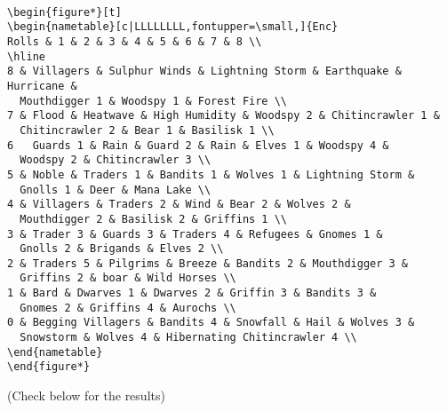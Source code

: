 \documentclass[a4paper,openany]{book}
\begin{document}
\begin{verbatim}

\begin{figure*}[t]
\begin{nametable}[c|LLLLLLLL,fontupper=\small,]{Enc}
Rolls & 1 & 2 & 3 & 4 & 5 & 6 & 7 & 8 \\
\hline
8 & Villagers & Sulphur Winds & Lightning Storm & Earthquake & Hurricane &
  Mouthdigger 1 & Woodspy 1 & Forest Fire \\
7 & Flood & Heatwave & High Humidity & Woodspy 2 & Chitincrawler 1 &
  Chitincrawler 2 & Bear 1 & Basilisk 1 \\
6   Guards 1 & Rain & Guard 2 & Rain & Elves 1 & Woodspy 4 &
  Woodspy 2 & Chitincrawler 3 \\
5 & Noble & Traders 1 & Bandits 1 & Wolves 1 & Lightning Storm &
  Gnolls 1 & Deer & Mana Lake \\
4 & Villagers & Traders 2 & Wind & Bear 2 & Wolves 2 &
  Mouthdigger 2 & Basilisk 2 & Griffins 1 \\
3 & Trader 3 & Guards 3 & Traders 4 & Refugees & Gnomes 1 &
  Gnolls 2 & Brigands & Elves 2 \\
2 & Traders 5 & Pilgrims & Breeze & Bandits 2 & Mouthdigger 3 &
  Griffins 2 & boar & Wild Horses \\
1 & Bard & Dwarves 1 & Dwarves 2 & Griffin 3 & Bandits 3 &
  Gnomes 2 & Griffins 4 & Aurochs \\
0 & Begging Villagers & Bandits 4 & Snowfall & Hail & Wolves 3 &
  Snowstorm & Wolves 4 & Hibernating Chitincrawler 4 \\
\end{nametable}
\end{figure*}

\end{verbatim}

(Check below for the results)
\end{document}
